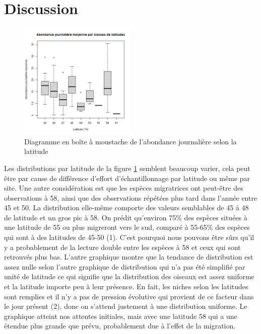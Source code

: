 \documentclass[9pt,twocolumn,twoside,]{pnas-new}
\begin{document}
\hypertarget{submitting-manuscripts}{%
\section*{Discussion}\label{submitting-manuscripts}}

\begin{figure}
\centering
\includegraphics[width=0.5\textwidth,height=0.4\textheight]{Figure2.png}
\caption{Diagramme en boîte à moustache de l'abondance journalière selon
la latitude \label{fig:plot1}}
\end{figure}

Les distributions par latitude de la figure \ref{fig:plot1} semblent
beaucoup varier, cela peut être par cause de différence d'effort
d'échantillonnage par latitude ou même par site. Une autre considération
est que les espèces migratrices ont peut-être des observations à 58,
ainsi que des observations répétées plus tard dans l'année entre 45 et
50. La distribution elle-même comporte des valeurs semblables de 45 à 48
de latitude et un gros pic à 58. On prédit qu'environ 75\% des espèces
situées à une latitude de 55 ou plus migreront vers le sud, comparé à
55-65\% des espèces qui sont à des latitudes de 45-50 (1). C'est
pourquoi nous pouvons être sûrs qu'il y a probablement de la lecture
double entre les espèces à 58 et ceux qui sont retrouvés plus bas.
L'autre graphique montre que la tendance de distribution est assez nulle
selon l'autre graphique de distribution qui n'a pas été simplifié par
unité de latitude ce qui signifie que la distribution des oiseaux est
assez uniforme et la latitude importe peu à leur présence. En fait, les
niches selon les latitudes sont remplies et il n'y a pas de pression
évolutive qui provient de ce facteur dans le jour présent (2), donc on
s'attend justement à une distribution uniforme. Le graphique atteint nos
attentes initiales, mais avec une latitude 58 qui a une étendue plus
grande que prévu, probablement due à l'effet de la migration.
\end{document}
